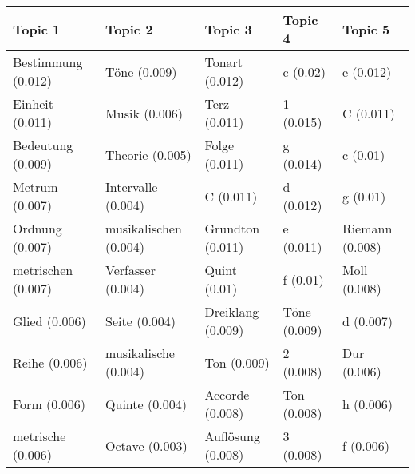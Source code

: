 \begin{tabular}{lllll}
\toprule
           Topic 1 &               Topic 2 &           Topic 3 &      Topic 4 &         Topic 5 \\
\midrule
Bestimmung (0.012) &          Töne (0.009) &    Tonart (0.012) &     c (0.02) &       e (0.012) \\
   Einheit (0.011) &         Musik (0.006) &      Terz (0.011) &    1 (0.015) &       C (0.011) \\
 Bedeutung (0.009) &       Theorie (0.005) &     Folge (0.011) &    g (0.014) &        c (0.01) \\
    Metrum (0.007) &    Intervalle (0.004) &         C (0.011) &    d (0.012) &        g (0.01) \\
   Ordnung (0.007) & musikalischen (0.004) &  Grundton (0.011) &    e (0.011) & Riemann (0.008) \\
metrischen (0.007) &     Verfasser (0.004) &      Quint (0.01) &     f (0.01) &    Moll (0.008) \\
     Glied (0.006) &         Seite (0.004) & Dreiklang (0.009) & Töne (0.009) &       d (0.007) \\
     Reihe (0.006) &  musikalische (0.004) &       Ton (0.009) &    2 (0.008) &     Dur (0.006) \\
      Form (0.006) &        Quinte (0.004) &   Accorde (0.008) &  Ton (0.008) &       h (0.006) \\
 metrische (0.006) &        Octave (0.003) & Auflösung (0.008) &    3 (0.008) &       f (0.006) \\
\bottomrule
\end{tabular}
